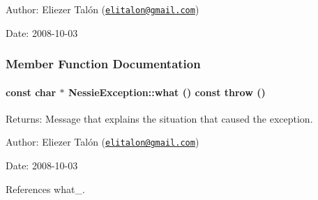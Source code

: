 \begin{Desc}
\item[Author:]Eliezer Talón (\href{mailto:elitalon@gmail.com}{\tt elitalon@gmail.com}) \end{Desc}
\begin{Desc}
\item[Date:]2008-10-03 \end{Desc}


\subsubsection{Member Function Documentation}
\hypertarget{class_nessie_exception_a522c2ea164e88be0b26670170b33909}{
\paragraph[{what}]{\setlength{\rightskip}{0pt plus 5cm}const char $\ast$ NessieException::what () const  throw ()}\hfill}
\label{class_nessie_exception_a522c2ea164e88be0b26670170b33909}


\begin{Desc}
\item[Returns:]Message that explains the situation that caused the exception.\end{Desc}
\begin{Desc}
\item[Author:]Eliezer Talón (\href{mailto:elitalon@gmail.com}{\tt elitalon@gmail.com}) \end{Desc}
\begin{Desc}
\item[Date:]2008-10-03 \end{Desc}


References what\_\-.